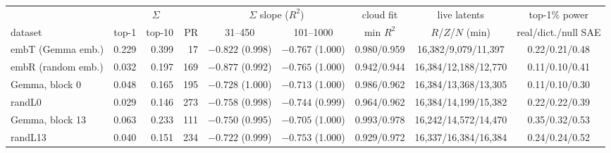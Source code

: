 \begin{tabular}{l rrr cc c c c}
\toprule
 & \multicolumn{3}{c}{$\Sigma$} & \multicolumn{2}{c}{$\Sigma$ slope ($R^2$)} & cloud fit & live latents & top-1\% power \\
\cmidrule(lr){2-4}\cmidrule(lr){5-6}
dataset & top-1 & top-10 & PR & 31--450 & 101--1000 & min $R^2$ & $R$/$Z$/$N$ (min) & real/dict./null SAE \\
\midrule
embT (Gemma emb.) & 0.229 & 0.399 & 17 & $-0.822$ (0.998) & $-0.767$ (1.000) & 0.980/0.959 & 16{,}382/9{,}079/11{,}397 & 0.22/0.21/0.48 \\
embR (random emb.) & 0.032 & 0.197 & 169 & $-0.877$ (0.992) & $-0.765$ (1.000) & 0.942/0.944 & 16{,}384/12{,}188/12{,}770 & 0.11/0.10/0.41 \\
Gemma, block 0 & 0.048 & 0.165 & 195 & $-0.728$ (1.000) & $-0.713$ (1.000) & 0.986/0.962 & 16{,}384/13{,}368/13{,}305 & 0.11/0.10/0.30 \\
randL0 & 0.029 & 0.146 & 273 & $-0.758$ (0.998) & $-0.744$ (0.999) & 0.964/0.962 & 16{,}384/14{,}199/15{,}382 & 0.22/0.22/0.39 \\
Gemma, block 13 & 0.063 & 0.233 & 111 & $-0.750$ (0.995) & $-0.705$ (1.000) & 0.993/0.978 & 16{,}242/14{,}572/14{,}470 & 0.35/0.32/0.53 \\
randL13 & 0.040 & 0.151 & 234 & $-0.722$ (0.999) & $-0.753$ (1.000) & 0.929/0.972 & 16{,}337/16{,}384/16{,}384 & 0.24/0.24/0.52 \\
\bottomrule
\end{tabular}
